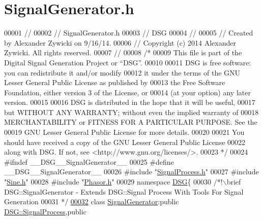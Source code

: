 \hypertarget{_signal_generator_8h_source}{\section{Signal\+Generator.\+h}
\label{_signal_generator_8h_source}
}

\begin{DoxyCode}
00001 \textcolor{comment}{//}
00002 \textcolor{comment}{//  SignalGenerator.h}
00003 \textcolor{comment}{//  DSG}
00004 \textcolor{comment}{//}
00005 \textcolor{comment}{//  Created by Alexander Zywicki on 9/16/14.}
00006 \textcolor{comment}{//  Copyright (c) 2014 Alexander Zywicki. All rights reserved.}
00007 \textcolor{comment}{//}
00008 \textcolor{comment}{/*}
00009 \textcolor{comment}{ This file is part of the Digital Signal Generation Project or “DSG”.}
00010 \textcolor{comment}{}
00011 \textcolor{comment}{ DSG is free software: you can redistribute it and/or modify}
00012 \textcolor{comment}{ it under the terms of the GNU Lesser General Public License as published by}
00013 \textcolor{comment}{ the Free Software Foundation, either version 3 of the License, or}
00014 \textcolor{comment}{ (at your option) any later version.}
00015 \textcolor{comment}{}
00016 \textcolor{comment}{ DSG is distributed in the hope that it will be useful,}
00017 \textcolor{comment}{ but WITHOUT ANY WARRANTY; without even the implied warranty of}
00018 \textcolor{comment}{ MERCHANTABILITY or FITNESS FOR A PARTICULAR PURPOSE.  See the}
00019 \textcolor{comment}{ GNU Lesser General Public License for more details.}
00020 \textcolor{comment}{}
00021 \textcolor{comment}{ You should have received a copy of the GNU Lesser General Public License}
00022 \textcolor{comment}{ along with DSG.  If not, see <http://www.gnu.org/licenses/>.}
00023 \textcolor{comment}{ */}
00024 \textcolor{preprocessor}{#ifndef \_\_DSG\_\_SignalGenerator\_\_}
00025 \textcolor{preprocessor}{#define \_\_DSG\_\_SignalGenerator\_\_}
00026 \textcolor{preprocessor}{#include "\hyperlink{_signal_process_8h}{SignalProcess.h}"}
00027 \textcolor{preprocessor}{#include "\hyperlink{_sine_8h}{Sine.h}"}
00028 \textcolor{preprocessor}{#include "\hyperlink{_phasor_8h}{Phasor.h}"}
00029 \textcolor{keyword}{namespace }\hyperlink{namespace_d_s_g}{DSG}\{\textcolor{comment}{}
00030 \textcolor{comment}{    /*!\(\backslash\)brief DSG::SignalGenerator - Extends DSG::Signal Process With Tools For Signal Generation}
00031 \textcolor{comment}{     */}
\hypertarget{_signal_generator_8h_source_l00032}{}\hyperlink{class_d_s_g_1_1_signal_generator}{00032}     \textcolor{keyword}{class }\hyperlink{class_d_s_g_1_1_signal_generator}{SignalGenerator}:\textcolor{keyword}{public} \hyperlink{class_d_s_g_1_1_signal_process}{DSG::SignalProcess},\textcolor{keyword}{public} 

\end{DoxyCode}
